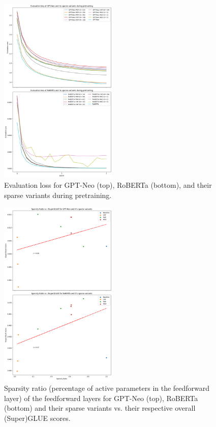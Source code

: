\begin{figure}[!h]
    \centering
    \includegraphics[width=0.5\textwidth]{evaluation_loss.png}
    \caption{Evaluation loss for GPT-Neo (top), RoBERTa (bottom), and their sparse variants during pretraining.}
    \label{fig:eval-loss}
\end{figure}

\begin{figure}[!h]
    \centering
    \includegraphics[width=0.5\textwidth]{sparsity_ratio_superglue.png}
    \caption{Sparsity ratio (percentage of active parameters in the feedforward layer) of the feedforward layers for GPT-Neo (top), RoBERTa (bottom) and their sparse variants vs. their respective overall (Super)GLUE scores.}
    \label{fig:spar-rat-super}
\end{figure}

